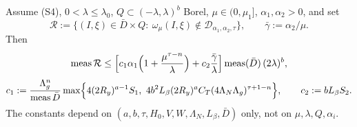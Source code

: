 \begin{proposition}\label{bpP:p4:two-scale-diophantine-measure}
Assume (S4), $0<\lambda\le\lambda_0$, $Q\subset(-\lambda,\lambda)^b$ Borel, $\mu\in(0,\mu_1]$, $\alpha_1,\alpha_2>0$, and set
\[\mathcal R:=\{(I,\xi)\in\bar D\times Q:\ \omega_\mu(I,\xi)\notin\mathcal D_{\alpha_1,\alpha_2,\tau}\},\qquad\bar\gamma:=\alpha_2/\mu.\]
Then
\[\operatorname{meas}\mathcal R\le\Bigl[c_1\alpha_1\Bigl(1+\frac{\mu^{\tau-n}}\lambda\Bigr)+c_2\frac{\bar\gamma}{\lambda}\Bigr]\operatorname{meas}(\bar D)\,(2\lambda)^b,\]
\[c_1:=\frac{\Lambda_g^n}{\meas\bar D}\max\Bigl\{4(2R_y)^{a-1}S_1,\ 4b^2L_\beta(2R_y)^aC_T(4\Lambda_N\Lambda_g)^{\tau+1-n}\Bigr\},\qquad c_2:=bL_\beta S_2.\]
The constants depend on $(a,b,\tau,H_0,V,W,\Lambda_N,L_\beta,\bar D)$ only, not on $\mu,\lambda,Q,\alpha_i$.
\end{proposition}
